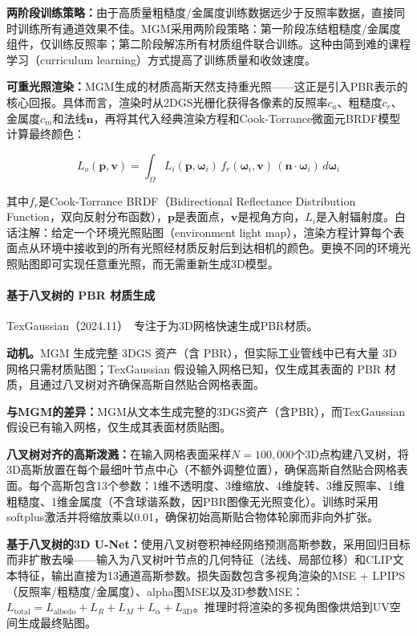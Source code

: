 \textbf{两阶段训练策略：}由于高质量粗糙度/金属度训练数据远少于反照率数据，直接同时训练所有通道效果不佳。MGM采用两阶段策略：第一阶段冻结粗糙度/金属度组件，仅训练反照率；第二阶段解冻所有材质组件联合训练。这种由简到难的课程学习（curriculum learning）方式提高了训练质量和收敛速度。

\textbf{可重光照渲染：}MGM生成的材质高斯天然支持重光照——这正是引入PBR表示的核心回报。具体而言，渲染时从2DGS光栅化获得各像素的反照率$c_a$、粗糙度$c_r$、金属度$c_m$和法线$\mathbf{n}$，再将其代入经典渲染方程和Cook-Torrance微面元BRDF模型计算最终颜色：

\begin{equation}
L_o(\mathbf{p}, \mathbf{v}) = \int_\Omega L_i(\mathbf{p}, \boldsymbol{\omega}_i)\, f_r(\boldsymbol{\omega}_i, \mathbf{v})\, (\mathbf{n} \cdot \boldsymbol{\omega}_i)\, d\boldsymbol{\omega}_i
\end{equation}

其中$f_r$是Cook-Torrance BRDF（Bidirectional Reflectance Distribution Function，双向反射分布函数），$\mathbf{p}$是表面点，$\mathbf{v}$是视角方向，$L_i$是入射辐射度。白话注解：给定一个环境光照贴图（environment light map），渲染方程计算每个表面点从环境中接收到的所有光照经材质反射后到达相机的颜色。更换不同的环境光照贴图即可实现任意重光照，而无需重新生成3D模型。

\paragraph{基于八叉树的 PBR 材质生成}

TexGaussian（2024.11）~\cite{2411_19654}专注于为3D网格快速生成PBR材质。

\textbf{动机。}MGM 生成完整 3DGS 资产（含 PBR），但实际工业管线中已有大量 3D 网格只需材质贴图；TexGaussian 假设输入网格已知，仅生成其表面的 PBR 材质，且通过八叉树对齐确保高斯自然贴合网格表面。

\textbf{与MGM的差异：}MGM从文本生成完整的3DGS资产（含PBR），而TexGaussian假设已有输入网格，仅生成其表面材质贴图。

\textbf{八叉树对齐的高斯泼溅：}在输入网格表面采样$N=100{,}000$个3D点构建八叉树，将3D高斯放置在每个最细叶节点中心（不额外调整位置），确保高斯自然贴合网格表面。每个高斯包含13个参数：1维不透明度、3维缩放、4维旋转、3维反照率、1维粗糙度、1维金属度（不含球谐系数，因PBR图像无光照变化）。训练时采用softplus激活并将缩放乘以0.01，确保初始高斯贴合物体轮廓而非向外扩张。

\textbf{基于八叉树的3D U-Net：}使用八叉树卷积神经网络预测高斯参数，采用回归目标而非扩散去噪——输入为八叉树叶节点的几何特征（法线、局部位移）和CLIP文本特征，输出直接为13通道高斯参数。损失函数包含多视角渲染的MSE + LPIPS（反照率/粗糙度/金属度）、alpha图MSE以及3D参数MSE：$L_\text{total} = L_\text{albedo} + L_R + L_M + L_\alpha + L_\text{3D}$。推理时将渲染的多视角图像烘焙到UV空间生成最终贴图。

